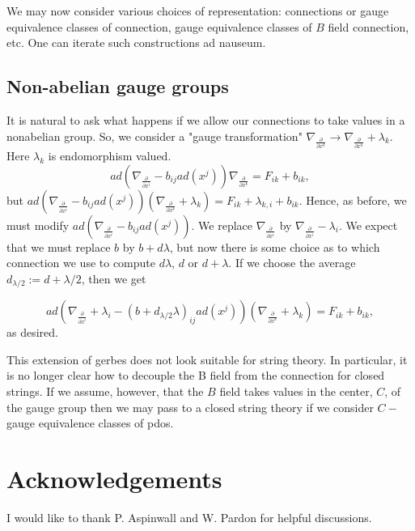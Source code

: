 \documentclass[a4paper,11pt]{amsart}
\begin{document}
We may now consider various choices of representation: 
connections or gauge equivalence classes of connection, gauge equivalence
classes of $B$ field connection, etc.  One can iterate such constructions ad
nauseum.

 
\subsection{Non-abelian gauge groups}
It is natural to ask what happens if we allow our connections to take values in
a nonabelian group. So, we consider a "gauge transformation" 
$\nabla_{\frac{\partial}{\partial x^k}}\rightarrow 
\nabla_{\frac{\partial}{\partial x^k}} + \lambda_k.$ 
Here $\lambda_k$ is endomorphism valued.
$$ad(\nabla_{\frac{\partial}{\partial x^i}}
 - b_{ij}ad(x^j))\nabla_{\frac{\partial}{\partial x^k}} = F_{ik} + b_{ik},$$
but 
$ad(\nabla_{\frac{\partial}{\partial x^i}}
 - b_{ij}ad(x^j))(\nabla_{\frac{\partial}{\partial x^k}} + \lambda_k)
  = F_{ik} + \lambda_{k,i} + b_{ik}.$ 
Hence, as before, we must modify $ad(\nabla_{\frac{\partial}{\partial x^i}}
 - b_{ij}ad(x^j))$. We replace 
 $\nabla_{\frac{\partial}{\partial x^i}}$ by 
$\nabla_{\frac{\partial}{\partial x^i}} - \lambda_i$. We expect that we 
must replace 
$b$ by $b + d\lambda$, but now there is some choice as to which connection we use to
compute $d\lambda$, $d$ or $d+\lambda$. If we choose the average 
$d_{\lambda/2}:= d+\lambda/2$, then we get 

$$ad(\nabla_{\frac{\partial}{\partial x^i}} + \lambda_i
 - (b+d_{\lambda/2}\lambda)_{ij}ad(x^j))(\nabla_{\frac{\partial}{\partial x^k}} + \lambda_k)
  = F_{ik} + b_{ik},$$
  as desired. 
  
This extension of gerbes does not look suitable for string theory. In
particular, it is no longer clear how to decouple the B field from the
connection for closed strings. If we assume, however, that the $B$ field takes
values in the center, $C$, of the gauge group then we may pass to a closed
 string theory if we consider $C-$ gauge equivalence classes of pdos.
 
    
\section{Acknowledgements}
I would like to thank P. Aspinwall and W. Pardon for helpful discussions.
\end{document}
